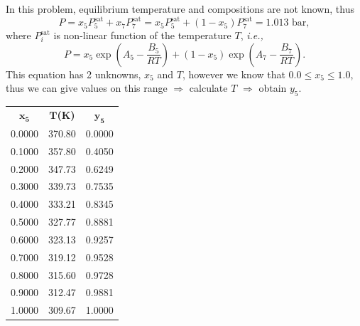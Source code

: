 \documentclass[12pts,a4paper,amsmath,amssymb,floatfix]{article}%
\newcommand{\frc}{\displaystyle\frac}
\newcommand{\ie}{{\it i.e., }}
\begin{document}
\begin{enumerate}[1)]
  In this problem, equilibrium temperature and compositions are not known, thus
          \begin{displaymath}
              P = x_{5}P_{5}^{\text{sat}} + x_{7}P_{7}^{\text{sat}} = x_{5}P_{5}^{\text{sat}} + \left(1 - x_{5}\right)P_{7}^{\text{sat}} = 1.013\text{ bar},
          \end{displaymath}
          where $P_{i}^{\text{sat}}$ is non-linear function of the temperature $T$, \ie
          \begin{displaymath}
              P = x_{5}\exp{\left(A_{5} - \frc{B_{5}}{RT}\right)} + \left(1 - x_{5}\right)\exp{\left(A_{7} - \frc{B_{7}}{RT}\right)}.
          \end{displaymath}
          This equation has 2 unknowns, $x_{5}$ and $T$, however we know that $0.0\leq x_{5} \leq 1.0$, thus we can give values on this range $\Rightarrow$ calculate $T$  $\Rightarrow$  obtain $y_{5}$.
          \begin{center}
              \begin{tabular}{ c c c }
                  $\mathbf{x_{5}}$ & $\mathbf{T}${\bf(K)}  & $\mathbf{y_{5}}$ \\
                    0.0000          & 370.80                & 0.0000   \\
                    0.1000          & 357.80                & 0.4050   \\
                    0.2000          & 347.73                & 0.6249   \\
                    0.3000          & 339.73                & 0.7535   \\
                    0.4000          & 333.21                & 0.8345   \\
                    0.5000          & 327.77                & 0.8881   \\
                    0.6000          & 323.13                & 0.9257   \\
                    0.7000          & 319.12                & 0.9528   \\
                    0.8000          & 315.60                & 0.9728   \\
                    0.9000          & 312.47                & 0.9881   \\
                    1.0000          & 309.67                & 1.0000   
              \end{tabular}
           \end{center}
           

\end{enumerate}
\end{document}
